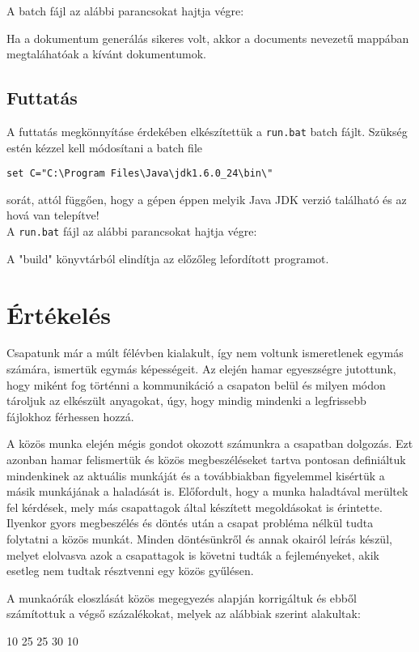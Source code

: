 A batch fájl az alábbi parancsokat hajtja végre:

Ha a dokumentum generálás sikeres volt, akkor a documents nevezetű mappában megtaláhatóak a kívánt dokumentumok.

\subsection{Futtatás}
A futtatás megkönnyításe érdekében elkészítettük a \texttt{run.bat} batch fájlt.
Szükség estén kézzel kell módosítani a batch file 
\begin{verbatim}
set C="C:\Program Files\Java\jdk1.6.0_24\bin\" 
\end{verbatim} sorát, attól függően, hogy a gépen éppen melyik Java JDK verzió található és az hová van telepítve!\\

A \texttt{run.bat} fájl az alábbi parancsokat hajtja végre:

A "build" könyvtárból elindítja az előzőleg lefordított programot.

\section{Értékelés}

Csapatunk már a múlt félévben kialakult, így nem voltunk ismeretlenek egymás számára, ismertük egymás képességeit. Az elején hamar egyeszségre jutottunk, hogy miként fog történni a kommunikáció a csapaton belül és milyen módon tároljuk az elkészült anyagokat, úgy, hogy mindig mindenki a legfrissebb fájlokhoz férhessen hozzá. 

A közös munka elején mégis gondot okozott számunkra a csapatban dolgozás. Ezt azonban hamar felismertük és közös megbeszéléseket tartva pontosan definiáltuk mindenkinek az aktuális munkáját és a továbbiakban figyelemmel kisértük a másik munkájának a haladását is. Előfordult, hogy a munka haladtával merültek fel kérdések, mely más csapattagok által készített megoldásokat is érintette. Ilyenkor gyors megbeszélés és döntés után a csapat probléma nélkül tudta folytatni a közös munkát. Minden döntésünkről és annak okairól leírás készül, melyet elolvasva azok a csapattagok is követni tudták a fejleményeket, akik esetleg nem tudtak résztvenni egy közös gyűlésen.

A munkaórák eloszlását közös megegyezés alapján korrigáltuk és ebből számítottuk a végső százalékokat, melyek az alábbiak szerint alakultak:

\begin{ertekeles}
{10}        %
{25}
{25}
{30}
{10}
\end{ertekeles}
